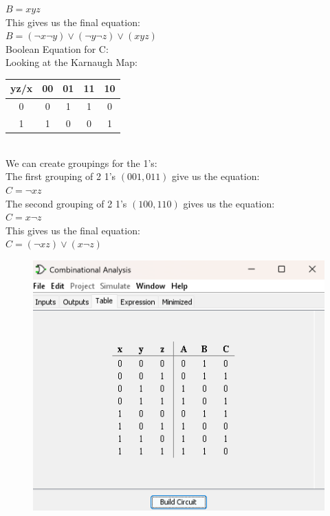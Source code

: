 \documentclass{article}
\begin{document}
{     $B = xyz$ \\
     This gives us the final equation: \\
     $B = (\neg x \neg y) \lor (\neg y \neg z) \lor (xyz)$ \\
     \linebreak
     Boolean Equation for C: \\
     Looking at the Karnaugh Map: \\
     \begin{tabular}{| c | c | c | c | c |}
          \hline
          yz/x & 00 & 01 & 11 & 10 \\
          \hline
          0 & 0 & 1 & 1 & 0 \\
          \hline
          1 & 1 & 0 & 0 & 1 \\
          \hline
     \end{tabular} \\
     \linebreak
     We can create groupings for the 1's: \\
     The first grouping of 2 1's $(001, 011)$ give us the equation: \\
     $C = \neg x z$ \\
     The second grouping of 2 1's $(100, 110)$ gives us the equation: \\
     $C = x \neg z$ \\
     This gives us the final equation: \\
     $C = (\neg x z) \lor (x \neg z)$ \\ 
}

 {
     \begin{figure}[H]
          \includegraphics[width=\textwidth]{./img/table.png} 
     \end{figure}
}
\end{document}
